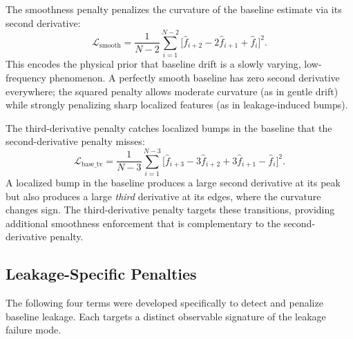 The smoothness penalty penalizes the curvature of the baseline estimate via its second derivative:
\begin{equation}
    \mathcal{L}_{\text{smooth}} = \frac{1}{N-2} \sum_{i=1}^{N-2} \big[\hat{f}_{i+2} - 2\hat{f}_{i+1} + \hat{f}_i\big]^2.
    \label{eq:smooth_loss}
\end{equation}
This encodes the physical prior that baseline drift is a slowly varying, low-frequency phenomenon. A perfectly smooth baseline has zero second derivative everywhere; the squared penalty allows moderate curvature (as in gentle drift) while strongly penalizing sharp localized features (as in leakage-induced bumps).

The third-derivative penalty catches localized bumps in the baseline that the second-derivative penalty misses:
\begin{equation}
    \mathcal{L}_{\text{base\_tv}} = \frac{1}{N-3} \sum_{i=1}^{N-3} \big[\hat{f}_{i+3} - 3\hat{f}_{i+2} + 3\hat{f}_{i+1} - \hat{f}_i\big]^2.
    \label{eq:baseline_tv_loss}
\end{equation}
A localized bump in the baseline produces a large second derivative at its peak but also produces a large \emph{third} derivative at its edges, where the curvature changes sign. The third-derivative penalty targets these transitions, providing additional smoothness enforcement that is complementary to the second-derivative penalty.


\subsection{Leakage-Specific Penalties}
\label{sec:method_loss_leakage}

The following four terms were developed specifically to detect and penalize baseline leakage. Each targets a distinct observable signature of the leakage failure mode.

